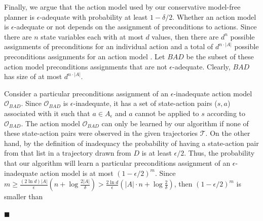 \documentclass{article}
\newenvironment{proof}{\noindent{\bf Proof:~~}}{\qed}
\newcommand{\qed}{\hfill\ensuremath{\blacksquare}}
\begin{document}
\begin{proof}
		
		Finally, we argue that the action model used by our conservative model-free planner is $\epsilon$-adequate with probability at least $1-\delta/2$. 
		Whether an action model is $\epsilon$-adequate or not depends on the assignment of preconditions to actions. 
		Since there are $n$ state variables each with at most $d$ values, 
		then there are $d^n$ possible assignments of preconditions for an individual action
		and a total of $d^{n\cdot |A|}$ possible preconditions assignments for an action model . 
		Let $BAD$ be the subset of these action model preconditions assignments that are not $\epsilon$-adequate. 
		Clearly, $BAD$ has size of at most $d^{n\cdot |A|}$. 
		
		
		Consider a particular preconditions assignment of an $\epsilon$-inadequate action model $\mathcal{O}_{BAD}$. Since $\mathcal{O}_{BAD}$ is $\epsilon$-inadequate, 
		it has a set of state-action pairs ($s,a$) associated with it such that $a\in A_\epsilon$ and $a$ cannot be applied to $s$ according to $\mathcal{O}_{BAD}$. 
		The action model $\mathcal{O}_{BAD}$ can only be learned by our algorithm 
		if none of these state-action pairs were observed in the given trajectories $\mathcal{T}$. 
		On the other hand, by the definition of inadequacy
		the probability of having a state-action pair from that list 
		in a trajectory drawn from $D$ is at least $\epsilon/2$. 
		Thus, the probability that our algorithm will learn a particular preconditions assignment of an $\epsilon$-inadequate action model is at most $(1-\epsilon/2)^m$.
		Since $m\geq\frac{(2\ln  d)|A|}{\epsilon}(n+\log\frac{2|A|}{\delta})>\frac{2\ln d}{\epsilon}(|A|\cdot n+\log\frac{2}{\delta})$, then $(1-\epsilon/2)^m$ is smaller than 
		
		

\end{proof}
\end{document}
